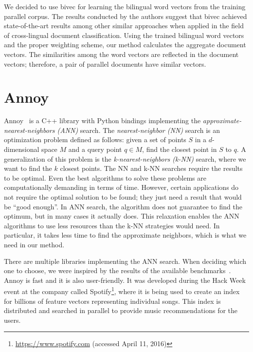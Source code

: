 We decided to use bivec for learning the bilingual word vectors from the training parallel corpus. The results conducted by the authors suggest that bivec achieved state-of-the-art results among other similar approaches when applied in the field of cross-lingual document classification. Using the trained bilingual word vectors and the proper weighting scheme, our method calculates the aggregate document vectors. The similarities among the word vectors are reflected in the document vectors; therefore, a pair of parallel documents have similar vectors.

\section{Annoy}
\label{section:annoy}

Annoy~\cite{annoy} is a C++ library with Python bindings implementing the \textit{approximate-nearest-neighbors (ANN)} search. The \textit {nearest-neighbor (NN)} search is an optimization problem defined as follows: given a set of points $S$ in a $d$-dimensional space $M$ and a query point $q \in M$, find the closest point in $S$ to $q$. A generalization of this problem is the \textit{k-nearest-neighbors (k-NN)} search, where we want to find the $k$ closest points. The NN and k-NN searches require the results to be optimal. Even the best algorithms to solve these problems are computationally demanding in terms of time. However, certain applications do not require the optimal solution to be found; they just need a result that would be ``good enough''. In ANN search, the algorithm does not guarantee to find the optimum, but in many cases it actually does. This relaxation enables the ANN algorithms to use less resources than the k-NN strategies would need. In particular, it takes less time to find the approximate neighbors, which is what we need in our method.

There are multiple libraries implementing the ANN search. When deciding which one to choose, we were inspired by the results of the available benchmarks~\cite{Bernhardsson16}. Annoy is fast and it is also user-friendly. It was developed during the Hack Week event at the company called Spotify\footnote{\url{https://www.spotify.com} (accessed April 11, 2016)}, where it is being used to create an index for billions of feature vectors representing individual songs. This index is distributed and searched in parallel to provide music recommendations for the users.

